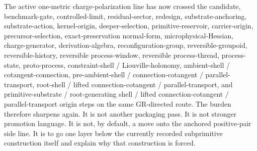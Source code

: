 \documentclass[11pt]{article}
\begin{document}
The active one-metric charge-polarization line has now crossed the candidate, benchmark-gate, controlled-limit, residual-sector, redesign, substrate-anchoring, substrate-action, kernel-origin, deeper-selection, primitive-reservoir, carrier-origin, precursor-selection, exact-preservation normal-form, microphysical-Hessian, charge-generator, derivation-algebra, reconfiguration-group, reversible-groupoid, reversible-history, reversible process-window, reversible process-thread, process-state, proto-process, constraint-shell / Liouville-holonomy, ambient-shell / cotangent-connection, pre-ambient-shell / connection-cotangent / parallel-transport, root-shell / lifted connection-cotangent / parallel-transport, and primitive-substrate / root-generating shell / lifted connection-cotangent / parallel-transport origin steps on the same GR-directed route. The burden therefore sharpens again. It is not another packaging pass. It is not stronger promotion language. It is not, by default, a move onto the anchored positive-pair side line. It is to go one layer below the currently recorded subprimitive construction itself and explain why that construction is forced.
\end{document}
